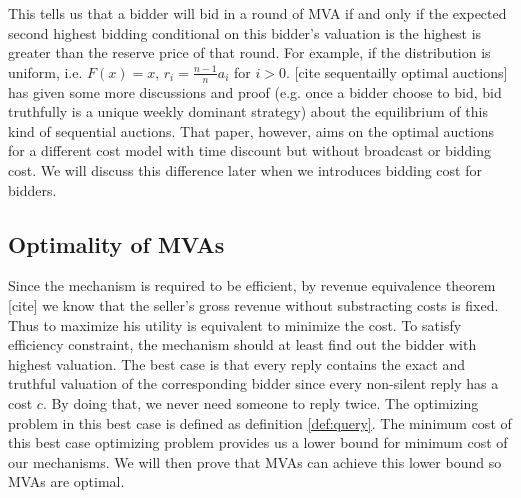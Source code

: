 This tells us that a bidder will bid in a round of MVA if and only if the
expected second highest bidding conditional on this bidder's valuation is the
highest is greater than the reserve price of that round. For example, if the
distribution is uniform, i.e. $F(x) = x$, $r_i = \frac{n-1}{n} a_i$ for $i >
0$. [cite sequentailly optimal auctions] has given some more discussions and
proof (e.g. once a bidder choose to bid, bid truthfully is a unique weekly
dominant strategy) about the equilibrium of this kind of sequential auctions.
That paper, however, aims on the optimal auctions for a different cost model
with time discount but without broadcast or bidding cost. We will discuss this
difference later when we introduces bidding cost for bidders.

\subsection{Optimality of MVAs}

Since the mechanism is required to be efficient, by revenue equivalence theorem
[cite] we know that the seller's gross revenue without substracting costs is
fixed. Thus to maximize his utility is equivalent to minimize the cost. To
satisfy efficiency constraint, the mechanism should at least find out the
bidder with highest valuation.  The best case is that every reply contains the
exact and truthful valuation of the corresponding bidder since every non-silent
reply has a cost $c$. By doing that, we never need someone to reply twice. The
optimizing problem in this best case is defined as definition \ref{def:query}.
The minimum cost of this best case optimizing problem provides us a lower bound
for minimum cost of our mechanisms. We will then prove that MVAs can achieve
this lower bound so MVAs are optimal.

